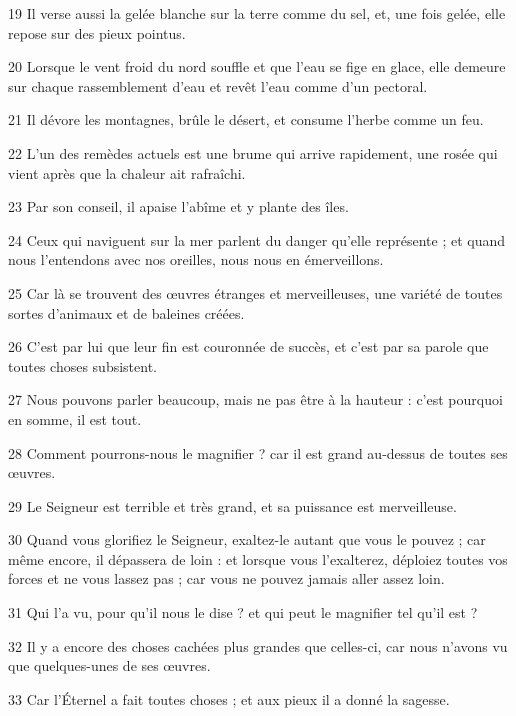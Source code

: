 \par 19 Il verse aussi la gelée blanche sur la terre comme du sel, et, une fois gelée, elle repose sur des pieux pointus.
\par 20 Lorsque le vent froid du nord souffle et que l'eau se fige en glace, elle demeure sur chaque rassemblement d'eau et revêt l'eau comme d'un pectoral.
\par 21 Il dévore les montagnes, brûle le désert, et consume l'herbe comme un feu.
\par 22 L'un des remèdes actuels est une brume qui arrive rapidement, une rosée qui vient après que la chaleur ait rafraîchi.
\par 23 Par son conseil, il apaise l'abîme et y plante des îles.
\par 24 Ceux qui naviguent sur la mer parlent du danger qu'elle représente ; et quand nous l'entendons avec nos oreilles, nous nous en émerveillons.
\par 25 Car là se trouvent des œuvres étranges et merveilleuses, une variété de toutes sortes d'animaux et de baleines créées.
\par 26 C'est par lui que leur fin est couronnée de succès, et c'est par sa parole que toutes choses subsistent.
\par 27 Nous pouvons parler beaucoup, mais ne pas être à la hauteur : c'est pourquoi en somme, il est tout.
\par 28 Comment pourrons-nous le magnifier ? car il est grand au-dessus de toutes ses œuvres.
\par 29 Le Seigneur est terrible et très grand, et sa puissance est merveilleuse.
\par 30 Quand vous glorifiez le Seigneur, exaltez-le autant que vous le pouvez ; car même encore, il dépassera de loin : et lorsque vous l'exalterez, déploiez toutes vos forces et ne vous lassez pas ; car vous ne pouvez jamais aller assez loin.
\par 31 Qui l'a vu, pour qu'il nous le dise ? et qui peut le magnifier tel qu'il est ?
\par 32 Il y a encore des choses cachées plus grandes que celles-ci, car nous n'avons vu que quelques-unes de ses œuvres.
\par 33 Car l'Éternel a fait toutes choses ; et aux pieux il a donné la sagesse.


